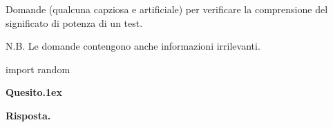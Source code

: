 \documentclass[11pt,twoside,a4paper]{article}
\newenvironment{question}{\bigskip\par\textbf{Quesito.\kern1ex}}{\vspace{\parskip}}
\newenvironment{answer}{\par\textbf{Risposta.\quad}}{}
\begin{document}
Domande (qualcuna capziosa e artificiale) per verificare la comprensione del significato di potenza di un test. 

N.B. Le domande contengono anche informazioni irrilevanti.

\begin{pycode}
import random
\end{pycode}

\begin{question}
\begin{pycode}

\end{pycode}

\begin{answer}

\end{answer}
\end{question}
\end{document}

